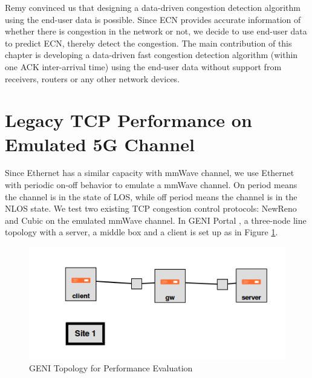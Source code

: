 \par Remy convinced us that designing a data-driven congestion detection algorithm using the end-user data is possible. Since ECN provides accurate information of whether there is congestion in the network or not, we decide to use end-user data to predict ECN, thereby detect the congestion. The main contribution of this chapter is developing a data-driven fast congestion detection algorithm (within one ACK inter-arrival time) using the end-user data without support from receivers, routers or any other network devices.

\section{Legacy TCP Performance on Emulated 5G Channel}
\label{legacy}
\par Since Ethernet has a similar capacity with mmWave channel, we use Ethernet with periodic on-off behavior to emulate a mmWave channel. On period means the channel is in the state of LOS, while off period means the channel is in the NLOS state. We test two existing TCP congestion control protocols: NewReno and Cubic on the emulated mmWave channel. In GENI Portal \cite{Geni}, a three-node line topology with a server, a middle box and a client is set up as in Figure \ref{genitopo}. 
\begin{figure}
\centering
\includegraphics[width=14cm]{topologyGeni.png}
\caption{GENI Topology for Performance Evaluation}
\label{genitopo}
\end{figure}
